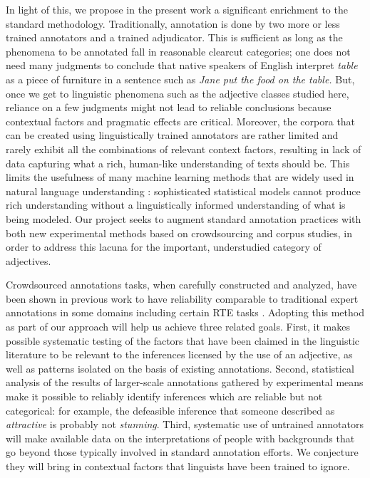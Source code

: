 \documentclass[10pt]{article}
\begin{document}
\medskip
In  light of this, we propose in the present work a significant enrichment to the standard methodology. Traditionally, annotation is done by two more or less trained annotators and a trained adjudicator. This is sufficient as long as the phenomena to be annotated fall in reasonable clearcut categories; one does not need many judgments to conclude that native speakers of English interpret \emph{table} as a piece of furniture in a sentence such as \emph{Jane put the food on the table.} But, once we get to 
linguistic phenomena such as the adjective classes studied here, reliance on a few judgments might not lead to reliable conclusions because contextual factors and pragmatic effects are critical.  
Moreover, the corpora that can be created using linguistically trained annotators are rather limited and rarely exhibit all the combinations of relevant context factors, resulting in lack of data capturing what a rich, human-like understanding of texts should be. This limits the usefulness of many machine learning methods that are widely used in natural language understanding \cite{manning1999foundations,wasserman2004all,murphy2012machine}: sophisticated statistical models cannot produce rich understanding without a linguistically informed understanding of what is being modeled. Our project seeks to augment standard annotation practices with both new experimental methods based on crowdsourcing and corpus studies, in order to address this lacuna for the important, understudied category of adjectives.

Crowdsourced annotations tasks, when carefully constructed and analyzed, have been shown in previous work to have reliability comparable to traditional expert annotations in some domains including certain RTE tasks \cite{snow:08,munroetal2010}. Adopting this method as part of our approach will help us achieve three related goals. First, it makes possible systematic testing of the factors that have been claimed in the linguistic literature to be relevant to the inferences licensed by the use of an adjective, as well as patterns isolated on the basis of existing annotations. Second, statistical analysis of the results of larger-scale annotations gathered by experimental means make it possible to reliably identify inferences which are reliable but not categorical: for example, the defeasible inference that someone described as \emph{attractive} is probably not \emph{stunning}. Third, systematic use of untrained annotators will make available data on the interpretations of people with backgrounds that go beyond those typically involved in standard annotation efforts. We conjecture they will bring in contextual factors that linguists have been trained to ignore.  
\end{document}
